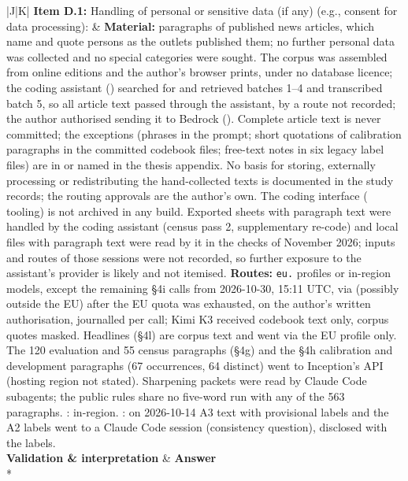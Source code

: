 \documentclass[12pt]{article}
\begin{document}
{\begin{longtable}{|J|K|}
\textbf{Item D.1:} Handling of personal or sensitive data (if any) (e.g., consent for data processing):
&
\textbf{Material:} paragraphs of published news articles, which name and quote persons as the outlets published them; no further personal data was collected and no special categories were sought. The corpus was assembled from online editions and the author's browser prints, under no database licence; the coding assistant () searched for and retrieved batches 1--4 and transcribed batch 5, so all article text passed through the assistant, by a route not recorded; the author authorised sending it to Bedrock (). Complete article text is never committed; the exceptions (phrases in the prompt; short quotations of calibration paragraphs in the committed codebook files; free-text notes in six legacy label files) are in  or named in the thesis appendix. No basis for storing, externally processing or redistributing the hand-collected texts is documented in the study records; the routing approvals are the author's own. The coding interface ( tooling) is not archived in any build. Exported sheets with paragraph text were handled by the coding assistant (census pass 2, supplementary re-code) and local files with paragraph text were read by it in the checks of November 2026; inputs and routes of those sessions were not recorded, so further exposure to the assistant's provider is likely and not itemised. \textbf{Routes:} \texttt{eu.} profiles or in-region models, except the remaining \S4i calls from 2026-10-30, 15:11 UTC, via  (possibly outside the EU) after the EU quota was exhausted, on the author's written authorisation, journalled per call; Kimi K3 received codebook text only, corpus quotes masked. Headlines (\S4l) are corpus text and went via the EU profile only. The 120 evaluation and 55 census paragraphs (\S4g) and the \S4h calibration and development paragraphs (67 occurrences, 64 distinct) went to Inception's API (hosting region not stated). Sharpening packets were read by Claude Code subagents; the public rules share no five-word run with any of the 563 paragraphs. : in-region. : on 2026-10-14 A3 text with provisional labels and the A2 labels went to a Claude Code session (consistency question), disclosed with the labels.
\\
\hline
{}
\textbf{Validation \& interpretation} & \textbf{Answer} \\*


\end{longtable}}
\end{document}
